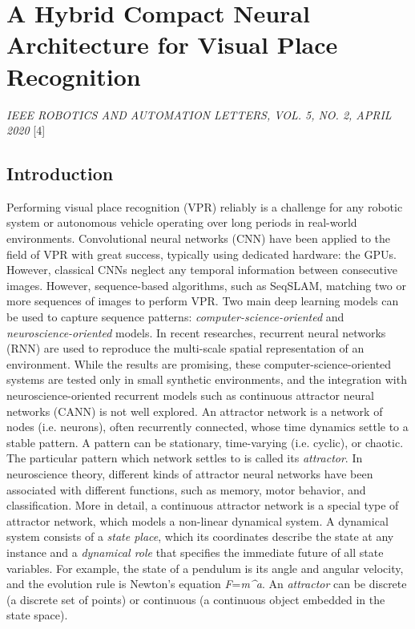 \section{A Hybrid Compact Neural Architecture for Visual Place
Recognition}

\emph{IEEE ROBOTICS AND AUTOMATION LETTERS, VOL. 5, NO. 2, APRIL 2020}
{[}4{]}

\subsection{Introduction}\label{header-n182}

Performing visual place recognition (VPR) reliably is a challenge for
any robotic system or autonomous vehicle operating over long periods in
real-world environments. Convolutional neural networks (CNN) have been
applied to the field of VPR with great success, typically using
dedicated hardware: the GPUs. However, classical CNNs neglect any
temporal information between consecutive images. However, sequence-based
algorithms, such as SeqSLAM, matching two or more sequences of images to
perform VPR. Two main deep learning models can be used to capture
sequence patterns: \emph{computer-science-oriented} and
\emph{neuroscience-oriented} models. In recent researches, recurrent
neural networks (RNN) are used to reproduce the multi-scale spatial
representation of an environment. While the results are promising, these
computer-science-oriented systems are tested only in small synthetic
environments, and the integration with neuroscience-oriented recurrent
models such as continuous attractor neural networks (CANN) is not well
explored. An attractor network is a network of nodes (i.e. neurons),
often recurrently connected, whose time dynamics settle to a stable
pattern. A pattern can be stationary, time-varying (i.e. cyclic), or
chaotic. The particular pattern which network settles to is called its
\emph{attractor}. In neuroscience theory, different kinds of attractor
neural networks have been associated with different functions, such as
memory, motor behavior, and classification. More in detail, a continuous
attractor network is a special type of attractor network, which models a
non-linear dynamical system. A dynamical system consists of a
\emph{state place}, which its coordinates describe the state at any
instance and a \emph{dynamical role} that specifies the immediate future
of all state variables. For example, the state of a pendulum is its
angle and angular velocity, and the evolution rule is Newton's equation
\emph{F}=\emph{m\^{}a}. An \emph{attractor} can be discrete (a discrete
set of points) or continuous (a continuous object embedded in the state
space).

